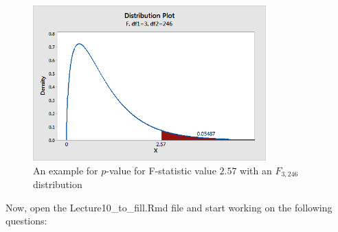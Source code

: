 \begin{figure}[H]
\begin{center}
  \includegraphics[width=0.8\textwidth]{Lecture10/p_value}
  \caption{An example for $p$-value for F-statistic value $2.57$ with an $F_{3, 246}$ distribution}
  \label{fig:p-value}
\end{center}
\end{figure}
%
\newpage
Now, open the \colorbox{shadecolor}{Lecture10\_to\_fill.Rmd} file and start working on the following questions:
